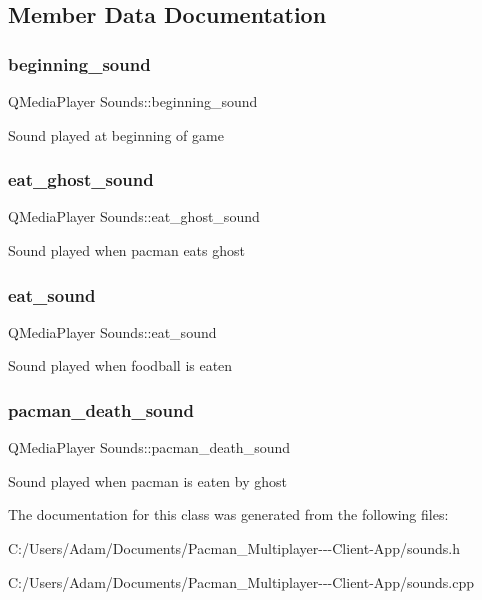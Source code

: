 \subsection{Member Data Documentation}
\mbox{\label{class_sounds_aa79b0142330a03976c36fe5c49a66c54}} 
\subsubsection{\texorpdfstring{beginning\+\_\+sound}{beginning\_sound}}
{\footnotesize\ttfamily Q\+Media\+Player Sounds\+::beginning\+\_\+sound}

Sound played at beginning of game \mbox{\label{class_sounds_a3c9fdf7f2d77cb9e9f4203e2e1a489f6}} 
\subsubsection{\texorpdfstring{eat\+\_\+ghost\+\_\+sound}{eat\_ghost\_sound}}
{\footnotesize\ttfamily Q\+Media\+Player Sounds\+::eat\+\_\+ghost\+\_\+sound}

Sound played when pacman eats ghost \mbox{\label{class_sounds_a9821fc886ba3bfb8404bf9fee86ddfbe}} 
\subsubsection{\texorpdfstring{eat\+\_\+sound}{eat\_sound}}
{\footnotesize\ttfamily Q\+Media\+Player Sounds\+::eat\+\_\+sound}

Sound played when foodball is eaten \mbox{\label{class_sounds_a8c8a27c32ae161a18da0cc8c6df09e69}} 
\subsubsection{\texorpdfstring{pacman\+\_\+death\+\_\+sound}{pacman\_death\_sound}}
{\footnotesize\ttfamily Q\+Media\+Player Sounds\+::pacman\+\_\+death\+\_\+sound}

Sound played when pacman is eaten by ghost 

The documentation for this class was generated from the following files\+:\begin{DoxyCompactItemize}
\item 
C\+:/\+Users/\+Adam/\+Documents/\+Pacman\+\_\+\+Multiplayer-\/-\/-\/\+Client-\/\+App/sounds.\+h\item 
C\+:/\+Users/\+Adam/\+Documents/\+Pacman\+\_\+\+Multiplayer-\/-\/-\/\+Client-\/\+App/sounds.\+cpp\end{DoxyCompactItemize}

